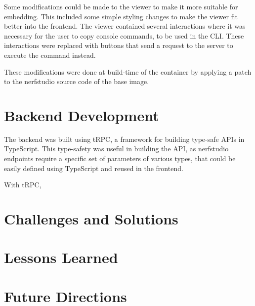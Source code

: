 Some modifications could be made to the viewer to make it more suitable for embedding.
This included some simple styling changes to make the viewer fit better into the frontend.
The viewer contained several interactions where it was necessary for the user to copy console commands, to be used in the CLI.
These interactions were replaced with buttons that send a request to the server to execute the command instead.

These modifications were done at build-time of the container by applying a patch to the nerfstudio source code of the base image.


\section{Backend Development}
\label{sec:system:backend}


The backend was built using tRPC, a framework for building type-safe APIs in TypeScript.
This type-safety was useful in building the API, as nerfstudio endpoints require a specific set of parameters of various types, that could be easily defined using TypeScript and reused in the frontend.

With tRPC, 

\section{Challenges and Solutions}
\label{sec:system:challenges}


\section{Lessons Learned}
\label{sec:system:lessons}

\section{Future Directions}
\label{sec:system:future}
